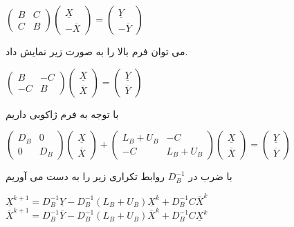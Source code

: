 	\begin{center}
	$
	\begin{pmatrix}
	B & C\\ 
	C & B 
	\end{pmatrix} 
	\begin{pmatrix}
	\underline{X}\\ 
	-\overline{X}
	\end{pmatrix} 
	=
	\begin{pmatrix}
	\underline{Y}\\ 
	-\overline{Y}
	\end{pmatrix} 
	$
	
	\end{center}
	می توان فرم بالا را به صورت زیر نمایش داد. 
	
	\begin{center}
	$
	\begin{pmatrix}
	B & -C\\ 
	-C & B 
	\end{pmatrix} 
	\begin{pmatrix}
	\underline{X}\\ 
	\overline{X}
	\end{pmatrix} 
	=
	\begin{pmatrix}
	\underline{Y}\\ 
	\overline{Y}
	\end{pmatrix} 
	$
	
	\end{center}
	با توجه به فرم ژاکوبی داریم 
	
	\begin{center} 
	$
	\begin{pmatrix}
	D_B & 0 \\
	0 & D_B 
	\end{pmatrix}
	\begin{pmatrix}
	\underline{X}\\
	\overline{X} 
	\end{pmatrix}
	+ 
	\begin{pmatrix}
	L_B + U_B & -C \\ 
	-C & L_B + U_B
	\end{pmatrix}
	\begin{pmatrix}
	\underline{X}\\
	\overline{X} 
	\end{pmatrix}
	=
	\begin{pmatrix}
	\underline{Y}\\
	\overline{Y} 
	\end{pmatrix}
	$\\
	\end{center} 
	با ضرب در $ D_B^{-1} $ روابط تکراری زیر را به دست می آوریم
	\begin{center}
	$\underline{X}^{k+1} = D_B^{-1}\underline{Y} - D_B^{-1}(L_B + U_B)\underline{X}^k + D_B^{-1}C\overline{X}^k$	
	$\overline{X}^{k+1} = D_B^{-1}\overline{Y} - D_B^{-1}(L_B + U_B)\overline{X}^k + D_B^{-1}C\underline{X}^k$
	\end{center} 

